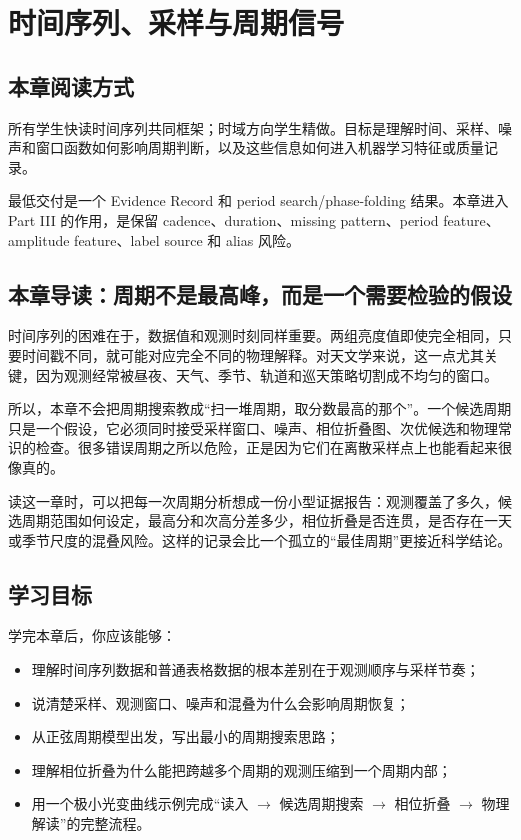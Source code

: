 \chapter{时间序列、采样与周期信号}

\section{本章阅读方式}

所有学生快读时间序列共同框架；时域方向学生精做。目标是理解时间、采样、噪声和窗口函数如何影响周期判断，以及这些信息如何进入机器学习特征或质量记录。

最低交付是一个 Evidence Record 和 period search/phase-folding 结果。本章进入 Part III 的作用，是保留 cadence、duration、missing pattern、period feature、amplitude feature、label source 和 alias 风险。

\section{本章导读：周期不是最高峰，而是一个需要检验的假设}

时间序列的困难在于，数据值和观测时刻同样重要。两组亮度值即使完全相同，只要时间戳不同，就可能对应完全不同的物理解释。对天文学来说，这一点尤其关键，因为观测经常被昼夜、天气、季节、轨道和巡天策略切割成不均匀的窗口。

所以，本章不会把周期搜索教成“扫一堆周期，取分数最高的那个”。一个候选周期只是一个假设，它必须同时接受采样窗口、噪声、相位折叠图、次优候选和物理常识的检查。很多错误周期之所以危险，正是因为它们在离散采样点上也能看起来很像真的。

读这一章时，可以把每一次周期分析想成一份小型证据报告：观测覆盖了多久，候选周期范围如何设定，最高分和次高分差多少，相位折叠是否连贯，是否存在一天或季节尺度的混叠风险。这样的记录会比一个孤立的“最佳周期”更接近科学结论。

\section{学习目标}

学完本章后，你应该能够：

\begin{itemize}
    \item 理解时间序列数据和普通表格数据的根本差别在于观测顺序与采样节奏；
    \item 说清楚采样、观测窗口、噪声和混叠为什么会影响周期恢复；
    \item 从正弦周期模型出发，写出最小的周期搜索思路；
    \item 理解相位折叠为什么能把跨越多个周期的观测压缩到一个周期内部；
    \item 用一个极小光变曲线示例完成“读入 $\rightarrow$ 候选周期搜索 $\rightarrow$ 相位折叠 $\rightarrow$ 物理解读”的完整流程。
\end{itemize}

